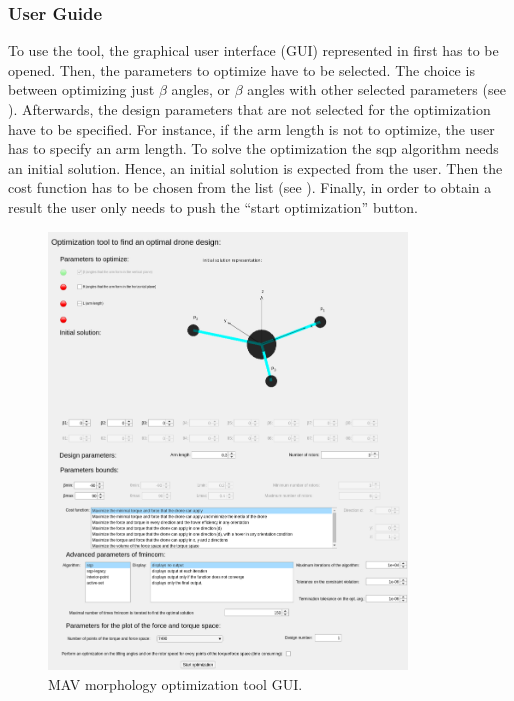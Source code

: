 \subsubsection{User Guide}
\label{sec:user_guide}
To use the tool, the graphical user interface (GUI) represented in 
first has to be opened. Then, the parameters to optimize have to be selected. The
choice is between optimizing just $\beta$ angles, or $\beta$ angles with other
selected parameters (see ). Afterwards, the design parameters that
are not selected for the optimization have to be specified. For instance, if the arm
length is not to optimize,  the user has to specify an arm length. To solve the
optimization the sqp algorithm needs an initial solution. Hence, an initial solution
is expected from the user. Then the cost function has to be chosen from the list
(see ). Finally, in order to obtain a result the user only needs to
push the “start optimization” button.

\begin{figure}[!h]
  \centering
  \includegraphics[width=0.85\textwidth]{images/gui.png}
  \caption{MAV morphology optimization tool GUI.}
  \label{fig:gui}
\end{figure}


